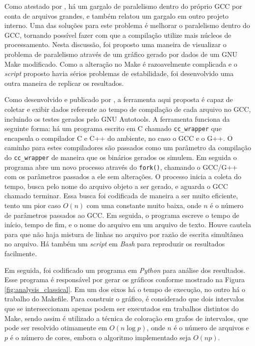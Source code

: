 Como atestado por \cite{PR84402}, há um gargalo de paralelismo dentro do
próprio GCC por conta de arquivos grandes, e \cite{mailgcc} também
relatou um gargalo em outro projeto interno. Uma das soluções para este
problema é melhorar o paralelismo dentro do GCC, tornando possível fazer
com que a compilação utilize mais núcleos de processamento.
Nesta discussão, foi proposto uma maneira de visualizar o problema de
paralelismo através de um gráfico gerado por dados de um GNU Make modificado.
Como a alteração no Make é razoavelmente complicada e o \textit{script} proposto
havia sérios problemas de estabilidade, foi desenvolvido uma outra maneira
de replicar os resultados.

Como desenvolvido e publicado por \cite{gcctimer}, a ferramenta aqui proposta
é capaz de coletar e exibir dados referente ao tempo de compilação
de cada arquivo no GCC, incluindo os testes gerados pelo GNU Autotools.
A ferramenta funciona da seguinte forma: há um programa escrito em C chamado
\texttt{cc\_wrapper} que encapsula o compilador C e C++ do ambiente, no caso o 
GCC e o G++. O caminho para estes compiladores são passados como um parâmetro
da compilação do \texttt{cc\_wrapper} de maneira que os binários gerados os
simulem. Em seguida o programa abre um novo processo através do \texttt{fork()},
chamando o GCC/G++ com os parâmetros passados a ele sem alterações. O processo
inicia a coleta do tempo, busca pelo nome do arquivo objeto a ser gerado, e
aguarda o GCC chamado terminar. Essa busca foi codificada de maneira a ser
muito eficiente, tento um pior caso $O(n)$ com uma constante muito baixa,
onde $n$ é o número de parâmetros passados ao GCC. Em seguida, o programa
escreve o tempo de início, tempo de fim, e o nome do arquivo em um arquivo
de texto. Houve cautela para que não haja mistura de linhas
no arquivo por razão de escrita simultânea no arquivo. Há também um \textit{script}
em \textit{Bash} para reproduzir os resultados facilmente.

Em seguida, foi codificado um programa em \textit{Python} para análise dos
resultados. Esse programa é responsável por gerar os gráficos conforme
mostrado na Figura \ref{fig:analysis_classical}. Em um dos eixos há o
tempo de execução, no outro há
o trabalho do Makefile. Para construir o gráfico, é considerado que
dois intervalos que se interseccionam apenas podem ser executados em
trabalhos distintos do Make, sendo assim é utilizado a técnica
de coloração em grafos de intervalos, que pode ser resolvido otimamente
em $O(n \log p)$, onde $n$ é o número de arquivos e $p$ é o número de
cores, embora o algoritmo
implementado seja $O(np)$.

